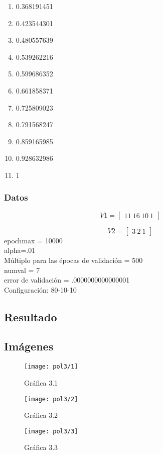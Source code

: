 \documentclass[6pt]{article}
\begin{document}
\begin{multicols}{4}
\begin{enumerate}
		\item 0.368191451
		\item 0.423544301
		\item 0.480557639
		\item 0.539262216
		\item 0.599686352
		\item 0.661858371
		\item 0.725809023
		\item 0.791568247
		\item 0.859165985
		\item 0.928632986
		\item 1
	\end{enumerate}
\end{multicols}
\subsubsection{Datos}
\[V1=
\begin{bmatrix}
11\ 16\ 10\ 1
\end{bmatrix}\]

\[V2=
\begin{bmatrix}
3\ 2\ 1
\end{bmatrix}\]
epochmax = 10000\\
alpha=.01\\
Múltiplo para las épocas de validación = 500\\
numval = 7\\
error de validación = .0000000000000001\\
Configuración: 80-10-10
\subsection{Resultado}
\subsection{Imágenes}
\begin{figure}[htpb]
	\centering
	\texttt{[image: pol3/1]}
	\caption{Gráfica 3.1}
\end{figure}

\begin{figure}[htpb]
	\centering
	\texttt{[image: pol3/2]}
	\caption{Gráfica 3.2}
\end{figure}

\begin{figure}[htpb]
	\centering
	\texttt{[image: pol3/3]}
	\caption{Gráfica 3.3}
\end{figure}
\end{document}
